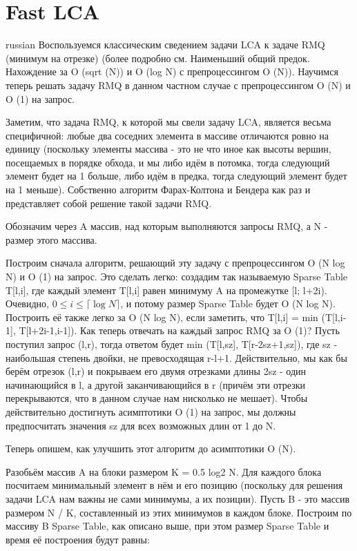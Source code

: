 \documentclass{article}
\begin{document}
\section{Fast LCA}
\begin{otherlanguage*}{russian}
    Воспользуемся классическим сведением задачи LCA к задаче RMQ (минимум на отрезке) (более подробно см. Наименьший общий предок. Нахождение за O (sqrt (N)) и O (log N) с препроцессингом O (N)). Научимся теперь решать задачу RMQ в данном частном случае с препроцессингом O (N) и O (1) на запрос.

    Заметим, что задача RMQ, к которой мы свели задачу LCA, является весьма специфичной: любые два соседних элемента в массиве отличаются ровно на единицу (поскольку элементы массива - это не что иное как высоты вершин, посещаемых в порядке обхода, и мы либо идём в потомка, тогда следующий элемент будет на 1 больше, либо идём в предка, тогда следующий элемент будет на 1 меньше). Собственно алгоритм Фарах-Колтона и Бендера как раз и представляет собой решение такой задачи RMQ.

    Обозначим через A массив, над которым выполняются запросы RMQ, а N - размер этого массива.

    Построим сначала алгоритм, решающий эту задачу с препроцессингом O (N log N) и O (1) на запрос. Это сделать легко: создадим так называемую Sparse Table T[l,i], где каждый элемент T[l,i] равен минимуму A на промежутке [l; l+2i). Очевидно, $0 \leq i \leq \lceil \log N\rceil$, и потому размер Sparse Table будет O (N log N). Построить её также легко за O (N log N), если заметить, что T[l,i] = min (T[l,i-1], T[l+2i-1,i-1]). Как теперь отвечать на каждый запрос RMQ за O (1)? Пусть поступил запрос (l,r), тогда ответом будет min (T[l,sz], T[r-2sz+1,sz]), где sz - наибольшая степень двойки, не превосходящая r-l+1. Действительно, мы как бы берём отрезок (l,r) и покрываем его двумя отрезками длины 2sz - один начинающийся в l, а другой заканчивающийся в r (причём эти отрезки перекрываются, что в данном случае нам нисколько не мешает). Чтобы действительно достигнуть асимптотики O (1) на запрос, мы должны предпосчитать значения sz для всех возможных длин от 1 до N.

    Теперь опишем, как улучшить этот алгоритм до асимптотики O (N).

    Разобьём массив A на блоки размером K = 0.5 log2 N. Для каждого блока посчитаем минимальный элемент в нём и его позицию (поскольку для решения задачи LCA нам важны не сами минимумы, а их позиции). Пусть B - это массив размером N / K, составленный из этих минимумов в каждом блоке. Построим по массиву B Sparse Table, как описано выше, при этом размер Sparse Table и время её построения будут равны:


\end{otherlanguage*}
\end{document}
